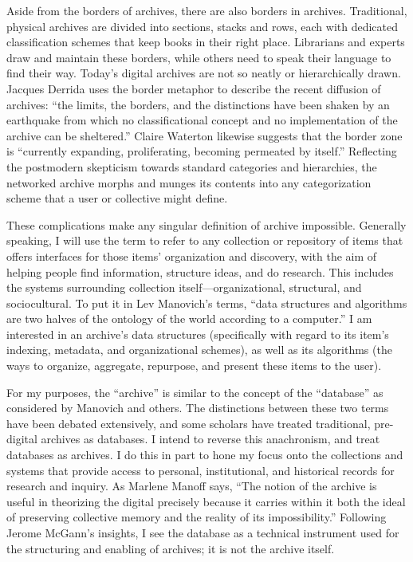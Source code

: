 Aside from the borders of archives, there are also borders in archives. Traditional, physical archives are divided into sections, stacks and rows, each with dedicated classification schemes that keep books in their right place. Librarians and experts draw and maintain these borders, while others need to speak their language to find their way. Today’s digital archives are not so neatly or hierarchically drawn. Jacques Derrida uses the border metaphor to describe the recent diffusion of archives: “the limits, the borders, and the distinctions have been shaken by an earthquake from which no classificational concept and no implementation of the archive can be sheltered.”  Claire Waterton likewise suggests that the border zone is “currently expanding, proliferating, becoming permeated by itself.”  Reflecting the postmodern skepticism towards standard categories and hierarchies, the networked archive morphs and munges its contents into any categorization scheme that a user or collective might define.

These complications make any singular definition of archive impossible. Generally speaking, I will use the term to refer to any collection or repository of items that offers interfaces for those items’ organization and discovery, with the aim of helping people find information, structure ideas, and do research. This includes the systems surrounding collection itself—organizational, structural, and sociocultural. To put it in Lev Manovich’s terms, “data structures and algorithms are two halves of the ontology of the world according to a computer.”  I am interested in an archive’s data structures (specifically with regard to its item’s indexing, metadata, and organizational schemes), as well as its algorithms (the ways to organize, aggregate, repurpose, and present these items to the user).

For my purposes, the “archive” is similar to the concept of the “database” as considered by Manovich and others. The distinctions between these two terms have been debated extensively, and some scholars have treated traditional, pre-digital archives as databases.  I intend to reverse this anachronism, and treat databases as archives. I do this in part to hone my focus onto the collections and systems that provide access to personal, institutional, and historical records for research and inquiry. As Marlene Manoff says, “The notion of the archive is useful in theorizing the digital precisely because it carries within it both the ideal of preserving collective memory and the reality of its impossibility.”  Following Jerome McGann’s insights, I see the database as a technical instrument used for the structuring and enabling of archives; it is not the archive itself. 

